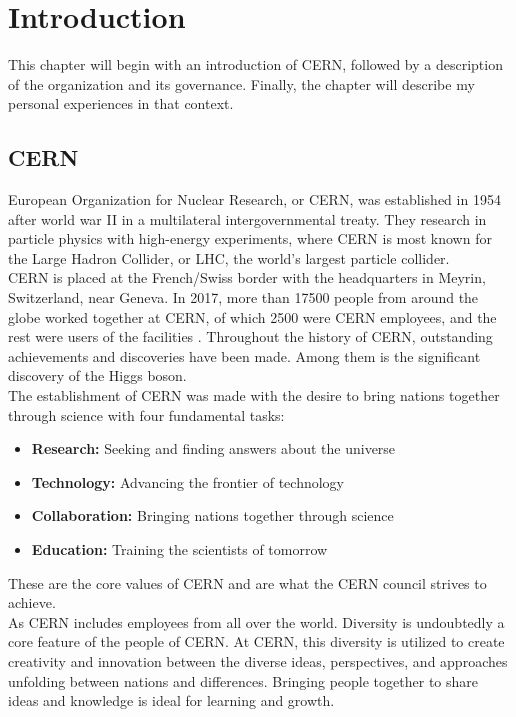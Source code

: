 \chapter{Introduction}

This chapter will begin with an introduction of CERN, followed by a description of the organization and its governance. Finally, the chapter will describe my personal experiences in that context.

\section{CERN}

European Organization for Nuclear Research, or CERN, was established in 1954 after world war II in a multilateral intergovernmental treaty. They research in particle physics with high-energy experiments, where CERN is most known for the Large Hadron Collider, or LHC, the world's largest particle collider. \\

\noindent CERN is placed at the French/Swiss border with the headquarters in Meyrin, Switzerland, near Geneva. In 2017, more than 17500 people from around the globe worked together at CERN, of which 2500 were CERN employees, and the rest were users of the facilities \cite{OurPeopl98:online}. Throughout the history of CERN, outstanding achievements and discoveries have been made. Among them is the significant discovery of the Higgs boson.\\ 

\noindent The establishment of CERN was made with the desire to bring nations together through science with four fundamental tasks:

\begin{itemize}
    \item \textbf{Research:} Seeking and finding answers about the universe
    \item \textbf{Technology:} Advancing the frontier of technology
    \item \textbf{Collaboration:} Bringing nations together through science
    \item \textbf{Education:} Training the scientists of tomorrow
\end{itemize}

\noindent These are the core values of CERN and are what the CERN council strives to achieve.\\

\noindent As CERN includes employees from all over the world. Diversity is undoubtedly a core feature of the people of CERN. At CERN, this diversity is utilized to create creativity and innovation between the diverse ideas, perspectives, and approaches unfolding between nations and differences. Bringing people together to share ideas and knowledge is ideal for learning and growth. 

